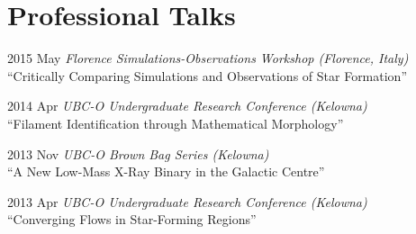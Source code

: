 \documentclass[letterpaper,11pt]{article}
\newlength{\mainindent} \setlength{\mainindent}{12pt}
\newlength{\contentindent} \setlength{\contentindent}{19ex}
\newenvironment{datelist}{
  \begingroup
  \raggedright
  \begin{description}[labelindent=\mainindent,leftmargin=\contentindent,
      style=sameline,font=\normalfont,topsep=0pt,partopsep=0pt,parsep=0pt,
      itemsep=4pt]
}{
  \end{description}
  \endgroup
}
\begin{document}




\section*{Professional Talks}
\begin{datelist}
\item[2015 May] \emph{Florence Simulations-Observations Workshop (Florence, Italy)} \\ ``Critically Comparing Simulations and Observations of Star Formation''
\item[2014 Apr] \emph{UBC-O Undergraduate Research Conference (Kelowna)} \\ ``Filament Identification through Mathematical Morphology''
\item[2013 Nov] \emph{UBC-O Brown Bag Series (Kelowna)} \\ ``A New Low-Mass X-Ray Binary in the Galactic Centre''
\item[2013 Apr] \emph{UBC-O Undergraduate Research Conference (Kelowna)} \\ ``Converging Flows in Star-Forming Regions''
\end{datelist}
\end{document}
